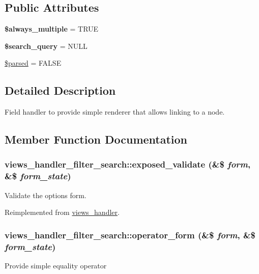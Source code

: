 \subsection*{Public Attributes}
\begin{DoxyCompactItemize}
\item 
\hypertarget{classviews__handler__filter__search_a595b4ee1b1480ff0b41798ebd3778ac2}{
{\bfseries \$always\_\-multiple} = TRUE}
\label{classviews__handler__filter__search_a595b4ee1b1480ff0b41798ebd3778ac2}

\item 
\hypertarget{classviews__handler__filter__search_ae8b3c02ef993560784deb77dbe7fbe07}{
{\bfseries \$search\_\-query} = NULL}
\label{classviews__handler__filter__search_ae8b3c02ef993560784deb77dbe7fbe07}

\item 
\hyperlink{classviews__handler__filter__search_ac2691a5da99694cf3cc5fd1f6c771a7a}{\$parsed} = FALSE
\end{DoxyCompactItemize}


\subsection{Detailed Description}
Field handler to provide simple renderer that allows linking to a node. 

\subsection{Member Function Documentation}
\hypertarget{classviews__handler__filter__search_a4cdb0b399fcbd1e4a5643924b706dddd}{
\subsubsection[{exposed\_\-validate}]{\setlength{\rightskip}{0pt plus 5cm}views\_\-handler\_\-filter\_\-search::exposed\_\-validate (\&\$ {\em form}, \/  \&\$ {\em form\_\-state})}}
\label{classviews__handler__filter__search_a4cdb0b399fcbd1e4a5643924b706dddd}
Validate the options form. 

Reimplemented from \hyperlink{classviews__handler_a2dd536754e4764cc82ffe7c864f54b16}{views\_\-handler}.\hypertarget{classviews__handler__filter__search_a126abdcf04c59fd3e4be404ffd9969cf}{
\subsubsection[{operator\_\-form}]{\setlength{\rightskip}{0pt plus 5cm}views\_\-handler\_\-filter\_\-search::operator\_\-form (\&\$ {\em form}, \/  \&\$ {\em form\_\-state})}}
\label{classviews__handler__filter__search_a126abdcf04c59fd3e4be404ffd9969cf}
Provide simple equality operator 

